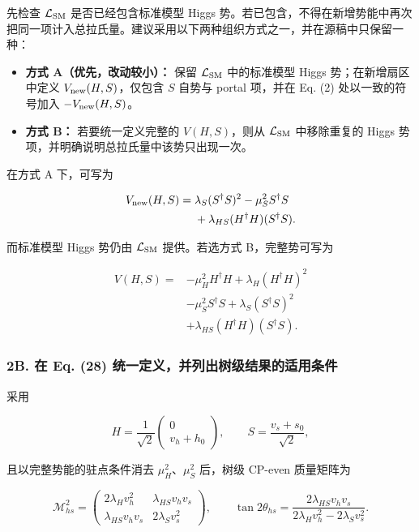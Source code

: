 \documentclass[
]{article}
\providecommand{\tightlist}{%
  \setlength{\itemsep}{0pt}\setlength{\parskip}{0pt}}
\begin{document}
先检查 \(\mathcal L_{\rm SM}\) 是否已经包含标准模型 Higgs
势。若已包含，不得在新增势能中再次把同一项计入总拉氏量。建议采用以下两种组织方式之一，并在源稿中只保留一种：

\begin{itemize}
\tightlist
\item
  \textbf{方式 A（优先，改动较小）：} 保留 \(\mathcal L_{\rm SM}\)
  中的标准模型 Higgs 势；在新增扇区中定义 \(V_{\rm new}(H,S)\)，仅包含
  \(S\) 自势与 portal 项，并在 Eq. (2) 处以一致的符号加入
  \(-V_{\rm new}(H,S)\)。
\item
  \textbf{方式 B：} 若要统一定义完整的 \(V(H,S)\)，则从
  \(\mathcal L_{\rm SM}\) 中移除重复的 Higgs
  势项，并明确说明总拉氏量中该势只出现一次。
\end{itemize}

在方式 A 下，可写为

\[
\begin{aligned}
V_{\rm new}(H,S)
={}& \lambda_S (S^\dagger S)^2
-\mu_S^2 S^\dagger S\\
&+\lambda_{HS}(H^\dagger H)(S^\dagger S).
\end{aligned}
\]

而标准模型 Higgs 势仍由 \(\mathcal L_{\rm SM}\) 提供。若选方式
B，完整势可写为

\[
\begin{aligned}
V(H,S)
={}&-\mu_H^2 H^\dagger H
+\lambda_H(H^\dagger H)^2\\
&-\mu_S^2 S^\dagger S
+\lambda_S(S^\dagger S)^2\\
&+\lambda_{HS}(H^\dagger H)(S^\dagger S).
\end{aligned}
\]


\subsubsection{2B. 在 Eq. (28)
统一定义，并列出树级结果的适用条件}\label{b.-ux5728-eq.-28-ux7edfux4e00ux5b9aux4e49ux5e76ux5217ux51faux6811ux7ea7ux7ed3ux679cux7684ux9002ux7528ux6761ux4ef6}

采用

\[
H=\frac{1}{\sqrt2}\begin{pmatrix}0\\v_h+h_0\end{pmatrix},\qquad
S=\frac{v_s+s_0}{\sqrt2},
\]

且以完整势能的驻点条件消去 \(\mu_H^2\)、\(\mu_S^2\) 后，树级 CP-even
质量矩阵为

\[
\mathcal M^2_{hs}=\begin{pmatrix}
2\lambda_Hv_h^2 & \lambda_{HS}v_hv_s\\
\lambda_{HS}v_hv_s & 2\lambda_Sv_s^2
\end{pmatrix},
\qquad
\tan 2\theta_{hs}=\frac{2\lambda_{HS}v_hv_s}
{2\lambda_Hv_h^2-2\lambda_Sv_s^2}.
\]
\end{document}
